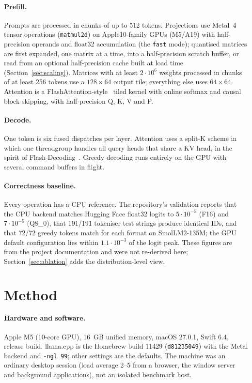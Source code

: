 \documentclass[10pt,twocolumn]{article}
\begin{document}
\paragraph{Prefill.} Prompts are processed in chunks of up to 512 tokens. Projections use Metal~4 tensor operations (\texttt{matmul2d}) on Apple10-family GPUs (M5/A19) with half-precision operands and float32 accumulation (the \texttt{fast} mode); quantised matrices are first expanded, one matrix at a time, into a half-precision scratch buffer, or read from an optional half-precision cache built at load time (Section~\ref{sec:scaling}). Matrices with at least $2\cdot10^{6}$ weights processed in chunks of at least 256 tokens use a $128{\times}64$ output tile; everything else uses $64{\times}64$. Attention is a FlashAttention-style~\cite{flashattention} tiled kernel with online softmax and causal block skipping, with half-precision Q, K, V and P.

\paragraph{Decode.} One token is six fused dispatches per layer. Attention uses a split-K scheme in which one threadgroup handles all query heads that share a KV head, in the spirit of Flash-Decoding~\cite{flashdecoding}. Greedy decoding runs entirely on the GPU with several command buffers in flight.

\paragraph{Correctness baseline.} Every operation has a CPU reference. The repository's validation reports that the CPU backend matches Hugging Face float32 logits to $5\cdot10^{-5}$ (F16) and $7\cdot10^{-5}$ (Q8\_0), that 191/191 tokeniser test strings produce identical IDs, and that 72/72 greedy tokens match for each format on SmolLM2-135M; the GPU default configuration lies within $1.1\cdot10^{-3}$ of the logit peak. These figures are from the project documentation and were not re-derived here; Section~\ref{sec:ablation} adds the distribution-level view.

\section{Method}
\label{sec:method}
\paragraph{Hardware and software.} Apple M5 (10-core GPU), 16~GB unified memory, macOS 27.0.1, Swift 6.4, release build. llama.cpp is the Homebrew build 11429 (\texttt{d81235049}) with the Metal backend and \texttt{-ngl 99}; other settings are the defaults. The machine was an ordinary desktop session (load average 2--5 from a browser, the window server and background applications), not an isolated benchmark host.
\end{document}
